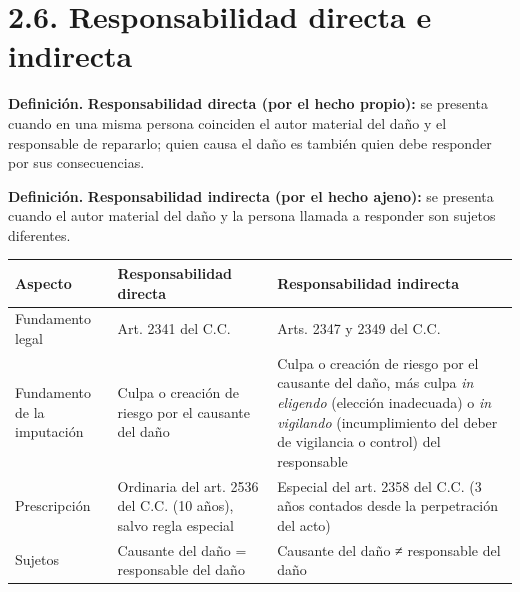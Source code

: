 \section{2.6. Responsabilidad directa e indirecta}
\begin{definicion}
\textcolor[HTML]{1F3864}{\textbf{Definición. }}\textbf{Responsabilidad directa (por el hecho propio): }se presenta cuando en una misma persona coinciden el autor material del daño y el responsable de repararlo; quien causa el daño es también quien debe responder por sus consecuencias.
\par
\textcolor[HTML]{1F3864}{\textbf{Definición. }}\textbf{Responsabilidad indirecta (por el hecho ajeno): }se presenta cuando el autor material del daño y la persona llamada a responder son sujetos diferentes.
\end{definicion}
\begin{tabla}
\begin{longtable}{|>{\raggedright\arraybackslash}m{}|>{\raggedright\arraybackslash}m{}|>{\raggedright\arraybackslash}m{}|}
\hline
\cellcolor[HTML]{1F3864}\textcolor[HTML]{FFFFFF}{\textbf{Aspecto}} & \cellcolor[HTML]{1F3864}\textcolor[HTML]{FFFFFF}{\textbf{Responsabilidad directa}} & \cellcolor[HTML]{1F3864}\textcolor[HTML]{FFFFFF}{\textbf{Responsabilidad indirecta}} \\ \hline
Fundamento legal & Art. 2341 del C.C. & Arts. 2347 y 2349 del C.C. \\ \hline
\cellcolor[HTML]{F2F5FA}Fundamento de la imputación & \cellcolor[HTML]{F2F5FA}Culpa o creación de riesgo por el causante del daño & \cellcolor[HTML]{F2F5FA}Culpa o creación de riesgo por el causante del daño, más culpa \textit{in eligendo} (elección inadecuada) o \textit{in vigilando} (incumplimiento del deber de vigilancia o control) del responsable \\ \hline
Prescripción & Ordinaria del art. 2536 del C.C. (10 años), salvo regla especial & Especial del art. 2358 del C.C. (3 años contados desde la perpetración del acto) \\ \hline
\cellcolor[HTML]{F2F5FA}Sujetos & \cellcolor[HTML]{F2F5FA}Causante del daño = responsable del daño & \cellcolor[HTML]{F2F5FA}Causante del daño ≠ responsable del daño \\ \hline
\end{longtable}
\end{tabla}
